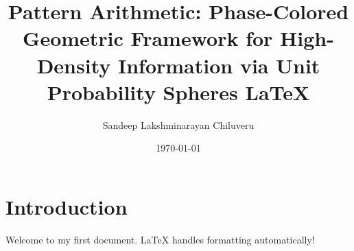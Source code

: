 \documentclass[12pt, a4paper]{article}
\title{Pattern Arithmetic: Phase-Colored Geometric Framework for High-Density Information via Unit Probability Spheres \LaTeX}
\author{Sandeep Lakshminarayan Chiluveru}
\date{\today}
\begin{document}
\maketitle %

\section{Introduction}
Welcome to my first document. LaTeX handles formatting automatically!
\end{document}
